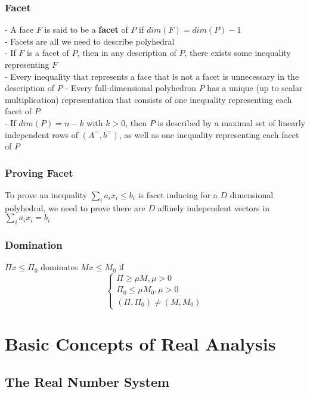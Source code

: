				\subsection{Facet}
					- A face $F$ is said to be a \textbf{facet} of $P$ if $dim(F) = dim(P)-1$\\
					- Facets are all we need to describe polyhedral\\
					- If $F$ is a facet of $P$, then in any description of $P$, there exists some inequality representing $F$\\
					- Every inequality that represents a face that is not a facet is unnecessary in the description of $P$
					- Every full-dimensional polyhedron $P$ has a unique (up to scalar multiplication) representation that consists of one inequality representing each facet of $P$\\
					- If $dim(P) = n-k$ with $k>0$, then $P$ is described by a maximal set of linearly independent rows of $(A^=, b^=)$, as well as one inequality representing each facet of $P$

				\subsection{Proving Facet}
					To prove an inequality $\sum_i a_i x_i \le b_i$ is facet inducing for a $D$ dimensional polyhedral, we need to prove there are $D$ affinely independent vectors in $\sum_i a_i x_i = b_i$

				\subsection{Domination}
					$\Pi x\le \Pi_0$ dominates $Mx\le M_0$ if
					\begin{equation}
						\begin{cases}
							\Pi \ge \mu M, \mu > 0\\
							\Pi_0 \le \mu M_0, \mu > 0\\
							(\Pi, \Pi_0) \ne (M, M_0)
						\end{cases}
					\end{equation}

		\chapter{Basic Concepts of Real Analysis}
			\section{The Real Number System}

